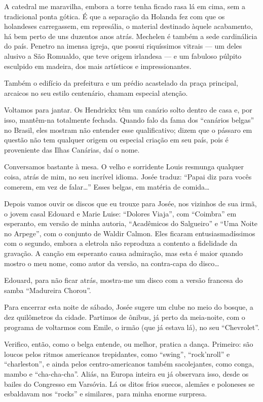 A catedral me maravilha, embora a torre tenha ficado rasa lá em cima, sem a tradicional ponta gótica. É que a separação da Holanda fez com que os holandeses carregassem, em represália, o material destinado àquele acabamento, há bem perto de uns duzentos anos atrás. Mechelen é também a sede cardinálicia do país. Penetro na imensa igreja, que possui riquíssimos vitrais --- um deles alusivo a São Romualdo, que teve origem irlandesa --- e um fabuloso púlpito esculpido em madeira, dos mais artísticos e impressionantes.

Também o edifício da prefeitura e um prédio acastelado da praça principal, arcaicos no seu estilo centenário, chamam especial atenção.

Voltamos para jantar. Os Hendrickx têm um canário solto dentro de casa e, por isso, mantêm-na totalmente fechada. Quando falo da fama dos ``canários belgas'' no Brasil, eles mostram não entender esse qualificativo; dizem que o pássaro em questão não tem qualquer origem ou especial criação em seu país, pois é proveniente das Ilhas Canárias, daí o nome.

Conversamos bastante à mesa. O velho e sorridente Louis resmunga qualquer coisa, atrás de mim, no seu incrível idioma. Josée traduz: ``Papai diz para vocês comerem, em vez de falar\ldots'' Esses belgas, em matéria de comida\ldots

Depois vamos ouvir os discos que eu trouxe para Josée, nos vizinhos de sua irmã, o jovem casal Edouard e Marie Luise: ``Dolores Viaja'', com ``Coimbra'' em esperanto, em versão de minha autoria, ``Acadêmicos do Salgueiro'' e ``Uma Noite no Arpege'', com o conjunto de Waldir Calmon. Eles ficaram entusiasmadíssimos com o segundo, embora a eletrola não reproduza a contento a fidelidade da gravação. A canção em esperanto causa admiração, mas esta é maior quando mostro o meu nome, como autor da versão, na contra-capa do disco\ldots

Edouard, para não ficar atrás, mostra-me um disco com a versão francesa do samba ``Madureira Chorou''.

Para encerrar esta noite de sábado, Josée sugere um clube no meio do bosque, a dez quilômetros da cidade. Partimos de ônibus, já perto da meia-noite, com o programa de voltarmos com Emile, o irmão (que já estava lá), no seu ``Chevrolet''.

Verifico, então, como o belga entende, ou melhor, pratica a dança. Primeiro: são loucos pelos ritmos americanos trepidantes, como ``swing'', ``rock’nroll'' e ``charleston'', e ainda pelos centro-americanos também sacolejantes, como conga, mambo e ``cha-cha-cha''. Aliás, na Europa inteira eu já observara isso, desde os bailes do Congresso em Varsóvia. Lá os ditos frios suecos, alemães e poloneses se esbaldavam nos ``rocks'' e similares, para minha enorme surpresa.


